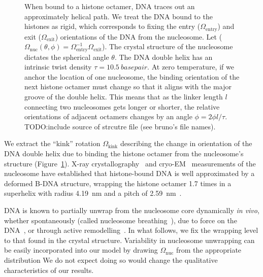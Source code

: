 \documentclass[%
 reprint,
superscriptaddress,
showpacs,preprintnumbers,
 amsmath,amssymb,
 aps,
 prl,
]{revtex4-1}
\begin{document}
\begin{figure}[t]
    \centering
    \caption{\protect{} When bound to a histone octamer, DNA traces out an
    approximately helical path. We treat the DNA bound to the histones as rigid,
    which corresponds to fixing the entry ($\Omega_\text{entry}$) and exit
    ($\Omega_\text{exit}$) orientations of the DNA from the nucleosome. Let
    ($\Omega_\text{nuc}(\theta, \phi)  =
    \Omega_\text{entry}^{-1}\Omega_\text{exit}$). The crystal structure of the
    nucleosome dictates the spherical angle $\theta$.
    \protect{} The DNA double helix has an intrinsic twist density
    $\tau=\SI{10.5}{basepair}$. At zero
    temperature, if we anchor the location of one nucleosome, the binding
    orientation of the next histone octamer must change so that it aligns with
    the major groove of the double helix. This means that as the linker length
    $l$ connecting two nucleosomes gets longer or shorter, the relative
    orientations of adjacent octamers changes by an angle $\phi = 2\phi l/\tau$.
    TODO:\@ include source of strcutre file (see bruno's file names).}\label{fig:nuc-geo}
\end{figure}

We extract the ``kink'' rotation $\Omega_\text{kink}$ describing the change in
    orientation of the DNA double helix due to binding the histone octamer from
    the nucleosome's structure (Figure~\ref{fig:nuc-geo}).
X-ray crystallography~\cite{white2001,richmond2003,cutter2015a} and
    cryo-EM~\cite{bednar2017,bilokapic2018,eltsov2018,wakamori2015,zhou2015}
    measurements of the nucleosome have established that histone-bound DNA is
    well approximated by a deformed B-DNA structure, wrapping the histone
    octamer 1.7 times in a superhelix with radius \SI{4.19}{\nano\metre} and a
    pitch of \SI{2.59}{\nano\metre}~\cite{richmond2003}.

DNA is known to partially unwrap from the nucleosome core dynamically \textit{in
    vivo}, whether spontaneously (called nucleosome breathing~\cite{TODO}), due to
    force on the DNA~\cite{TODO}, or through active
    remodelling~\cite{dion2007,kulaeva2007,senavirathne2017}.
In what follows, we fix the wrapping level to that found in the crystal
    structure.
Variability in nucleosome unwrapping can be easily incorporated into our model
    by drawing $\Omega_\text{nuc}$ from the appropriate distribution
We do not expect doing so would change the qualitative characteristics of our
    results.
\end{document}
